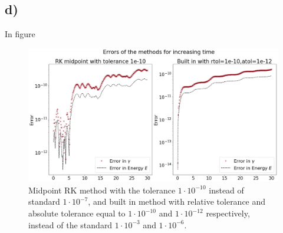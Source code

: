 \documentclass[12pt, a4paper,usenames,dvipsnames]{article}
\begin{document}
\subsection*{d)}
In figure
\begin{figure}
    \centering
    \includegraphics[width=0.7\linewidth]{graph2d2.png}
    \caption{Midpoint RK method with the tolerance \(1\cdot10^{-10}\) instead of standard \(1\cdot10^{-7}\), and built in method with relative tolerance and absolute tolerance equal to \(1\cdot10^{-10}\) and \(1\cdot10^{-12}\) respectively, instead of the standard \(1\cdot10^{-3}\) and \(1\cdot10^{-6}\). }
    \label{fig:gr2d2}
\end{figure}
\end{document}

